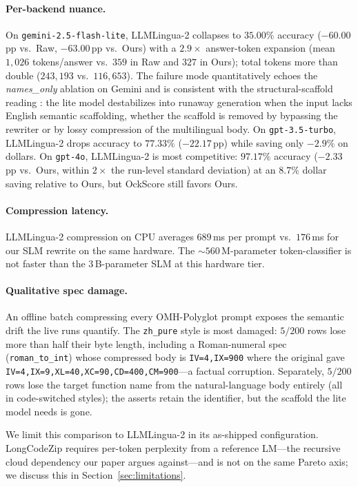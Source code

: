 \documentclass[11pt,a4paper,twocolumn]{article}
\begin{document}
\paragraph{Per-backend nuance.} On \texttt{gemini-2.5-flash-lite}, LLMLingua-2 collapses to $35.00\%$ accuracy ($-60.00$\,pp vs.\ Raw, $-63.00$\,pp vs.\ Ours) with a $2.9\times$ answer-token expansion (mean $1{,}026$ tokens/answer vs.\ $359$ in Raw and $327$ in Ours); total tokens more than double ($243{,}193$ vs.\ $116{,}653$). The failure mode quantitatively echoes the \textit{names\_only} ablation on Gemini and is consistent with the structural-scaffold reading \cite{ma2025sketch}: the lite model destabilizes into runaway generation when the input lacks English semantic scaffolding, whether the scaffold is removed by bypassing the rewriter or by lossy compression of the multilingual body. On \texttt{gpt-3.5-turbo}, LLMLingua-2 drops accuracy to $77.33\%$ ($-22.17$\,pp) while saving only $-2.9\%$ on dollars. On \texttt{gpt-4o}, LLMLingua-2 is most competitive: $97.17\%$ accuracy ($-2.33$\,pp vs.\ Ours, within $2\times$ the run-level standard deviation) at an $8.7\%$ dollar saving relative to Ours, but OckScore still favors Ours.

\paragraph{Compression latency.} LLMLingua-2 compression on CPU averages $689$\,ms per prompt vs.\ $176$\,ms for our SLM rewrite on the same hardware. The $\sim\!560$\,M-parameter token-classifier is not faster than the $3$\,B-parameter SLM at this hardware tier.

\paragraph{Qualitative spec damage.} An offline batch compressing every OMH-Polyglot prompt exposes the semantic drift the live runs quantify. The \texttt{zh\_pure} style is most damaged: $5/200$ rows lose more than half their byte length, including a Roman-numeral spec (\texttt{roman\_to\_int}) whose compressed body is \verb|IV=4,IX=900| where the original gave \verb|IV=4,IX=9,XL=40,XC=90,CD=400,CM=900|---a factual corruption. Separately, $5/200$ rows lose the target function name from the natural-language body entirely (all in code-switched styles); the asserts retain the identifier, but the scaffold the lite model needs is gone.

We limit this comparison to LLMLingua-2 in its as-shipped configuration. LongCodeZip \cite{shi2025longcodezip} requires per-token perplexity from a reference LM---the recursive cloud dependency our paper argues against---and is not on the same Pareto axis; we discuss this in Section~\ref{sec:limitations}.
\end{document}
